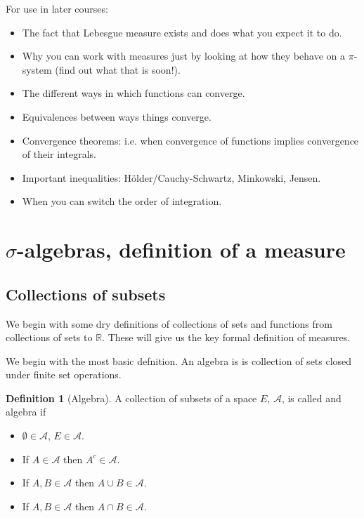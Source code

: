 \documentclass[11pt]{article}
\theoremstyle{definition}
\newtheorem{dfn}[thm]{Definition}
\theoremstyle{remark}
\begin{document}
For use in later courses:
\begin{itemize}
\item The fact that Lebesgue measure exists and does what you expect it to do.
\item Why you can work with measures just by looking at how they behave on a $\pi$-system (find out what that is soon!).
\item The different ways in which functions can converge.
\item Equivalences between ways things converge.
\item Convergence theorems: i.e. when convergence of functions implies convergence of their integrals.
\item Important inequalities: H\"older/Cauchy-Schwartz, Minkowski, Jensen.
\item When you can switch the order of integration.
\end{itemize}
\section{ $\sigma$-algebras, definition of a measure}
\subsection{Collections of subsets}
We begin with some dry definitions of collections of sets and functions from collections of sets to $\mathbb{R}$. These will give us the key formal definition of measures.

We begin with the most basic defnition. An algebra is is collection of sets closed under finite set operations. 
\begin{dfn}[Algebra]
A collection of subsets of a space $E$, $\mathcal{A}$, is called and algebra if
\begin{itemize}
\item $\emptyset \in \mathcal{A}, \, E \in \mathcal{A}$.
\item If $A \in \mathcal{A}$ then $A^c \in \mathcal{A}$.
\item If $A, B \in \mathcal{A}$ then $A \cup B \in \mathcal{A}$.
\item If $A, B \in \mathcal{A}$ then $A \cap B \in \mathcal{A}$.
\end{itemize}
\end{dfn}
\end{document}
